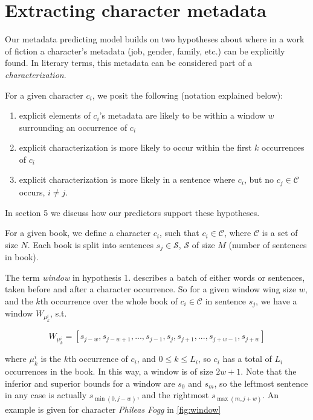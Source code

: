 \section{Extracting character metadata} \label{sec:metadata}
Our metadata predicting model builds on two hypotheses about where in a work of fiction a character's metadata (job, gender, family, etc.) can be explicitly found. In literary terms, this metadata can be considered part of a \textit{characterization}. 

For a given character $c_i$, we posit the following (notation explained below):
\begin{enumerate}
\item explicit elements of $c_i$'s metadata are likely to be within a window $w$ surrounding an occurrence of $c_i$
\item explicit characterization is more likely to occur within the first $k$ occurrences of $c_i$
\item explicit characterization is more likely in a sentence where $c_i$, but no $c_j \in \mathcal{C}$ occurs, $i \neq j$.
\end{enumerate}

In section 5 we discuss how our predictors support these hypotheses.

For a given book, we define a character $c_i$, such that $c_i \in \mathcal{C}$, where $\mathcal{C}$ is a set of size $N$. Each book is split into sentences $s_j \in \mathcal{S}$, $\mathcal{S}$ of size $M$ (number of sentences in book). 

The term \textit{window} in hypothesis 1. describes a batch of either words or sentences, taken before and after a character occurrence. So for a given window wing size $w$, and the $k$th occurrence over the whole book of $c_i \in \mathcal{C}$  in sentence $s_j$, we have a window $W_{\mu^i_k}$, s.t. 

\begin{equation}
W_{\mu^i_k} = [s_{j-w}, s_{j-w+1}, ...,  s_{j-1}, s_{j}, s_{j+1}, ..., s_{j+w-1}, s_{j+w}]
\end{equation}

where $\mu^i_k$ is the $k$th occurrence of $c_i$, and $0 \leq k \leq L_i$, so $c_i$ has a total of $L_i$ occurrences in the book. In this way, a window is of size $2w + 1$. Note that the inferior and superior bounds for a window are $s_0$ and $s_m$, so the leftmost sentence in any case is actually $s_{\min(0, j-w)}$, and the rightmost $s_{\max(m, j+w)}$. An example is given for character \textit{Phileas Fogg} in \cref{fig:window}


